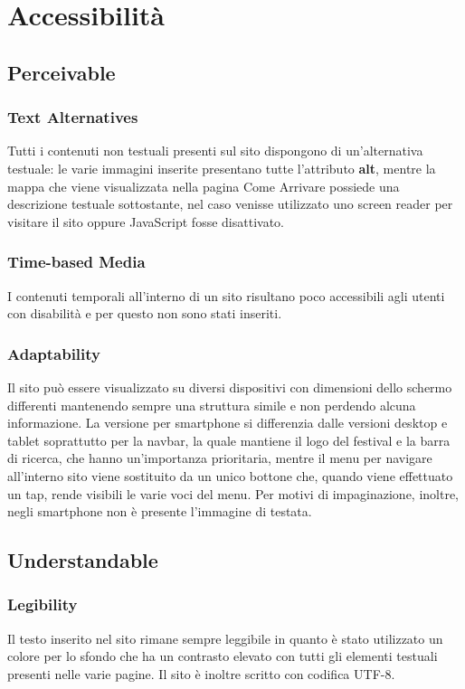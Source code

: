 \documentclass[10pt, a4paper]{article}
\begin{document}
\section{Accessibilità}

\subsection{Perceivable}


\subsubsection{Text Alternatives}
Tutti i contenuti non testuali presenti sul sito dispongono di un'alternativa testuale: le varie immagini inserite presentano tutte l'attributo \textbf{alt}, mentre la mappa che viene visualizzata nella pagina Come Arrivare possiede una descrizione testuale sottostante, nel caso venisse utilizzato uno screen reader per visitare il sito oppure JavaScript fosse disattivato.

\subsubsection{Time-based Media}
I contenuti temporali all'interno di un sito risultano poco accessibili agli utenti con disabilità e per questo non sono stati inseriti.

\subsubsection{Adaptability}
Il sito può essere visualizzato su diversi dispositivi con dimensioni dello schermo differenti mantenendo sempre una struttura simile e non perdendo alcuna informazione. La versione per smartphone si differenzia dalle versioni desktop e tablet soprattutto per la navbar, la quale mantiene il logo del festival e la barra di ricerca, che hanno un'importanza prioritaria, mentre il menu per navigare all'interno sito viene sostituito da un unico bottone che, quando viene effettuato un tap, rende visibili le varie voci del menu. Per motivi di impaginazione, inoltre, negli smartphone non è presente l’immagine di testata.

\subsection{Understandable}

\subsubsection{Legibility}
Il testo inserito nel sito rimane sempre leggibile in quanto è stato utilizzato un colore per lo sfondo che ha un contrasto elevato con tutti gli elementi testuali presenti nelle varie pagine. Il sito è inoltre scritto con codifica UTF-8.
\end{document}
